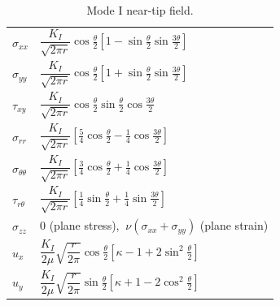 \documentclass[11pt,a4paper]{article}
\begin{document}
\begin{table}[!htbp]
\centering
\caption{Mode I near-tip field.}\label{tab:modeI}
\renewcommand{\arraystretch}{1.5}
\begin{tabular}{@{}ll@{}}
\toprule
$\sigma_{xx}$ & $\dfrac{K_I}{\sqrt{2\pi r}}\cos\frac\theta2\left[1-\sin\frac\theta2\sin\frac{3\theta}2\right]$\\
$\sigma_{yy}$ & $\dfrac{K_I}{\sqrt{2\pi r}}\cos\frac\theta2\left[1+\sin\frac\theta2\sin\frac{3\theta}2\right]$\\
$\tau_{xy}$ & $\dfrac{K_I}{\sqrt{2\pi r}}\cos\frac\theta2\sin\frac\theta2\cos\frac{3\theta}2$\\
$\sigma_{rr}$ & $\dfrac{K_I}{\sqrt{2\pi r}}\left[\frac54\cos\frac\theta2-\frac14\cos\frac{3\theta}2\right]$\\
$\sigma_{\theta\theta}$ & $\dfrac{K_I}{\sqrt{2\pi r}}\left[\frac34\cos\frac\theta2+\frac14\cos\frac{3\theta}2\right]$\\
$\tau_{r\theta}$ & $\dfrac{K_I}{\sqrt{2\pi r}}\left[\frac14\sin\frac\theta2+\frac14\sin\frac{3\theta}2\right]$\\
$\sigma_{zz}$ & $0$ (plane stress), $\ \nu(\sigma_{xx}+\sigma_{yy})$ (plane strain)\\
$u_x$ & $\dfrac{K_I}{2\mu}\sqrt{\dfrac r{2\pi}}\cos\frac\theta2\left[\kappa-1+2\sin^2\frac\theta2\right]$\\
$u_y$ & $\dfrac{K_I}{2\mu}\sqrt{\dfrac r{2\pi}}\sin\frac\theta2\left[\kappa+1-2\cos^2\frac\theta2\right]$\\
\bottomrule
\end{tabular}
\end{table}
\end{document}
